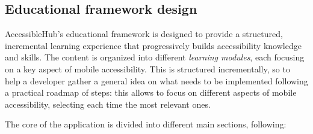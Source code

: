 \subsection{Educational framework design}

AccessibleHub's educational framework is designed to provide a structured, incremental learning experience that progressively builds accessibility knowledge and skills. The content is organized into different \textit{learning modules}, each focusing on a key aspect of mobile accessibility. This is structured incrementally, so to help a developer gather a general idea on what needs to be implemented following a practical roadmap of steps: this allows to focus on different aspects of mobile accessibility, selecting each time the most relevant ones.

The core of the application is divided into different main sections, following:

